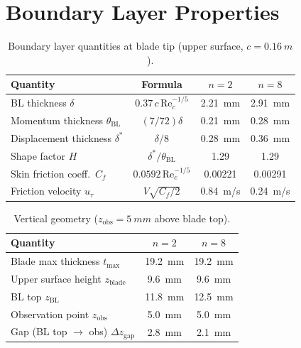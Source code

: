 \documentclass[11pt,a4paper]{article}
\begin{document}
\section{Boundary Layer Properties}
\label{sec:results_BL}

\begin{table}[H]
\centering
\caption{Boundary layer quantities at blade tip (upper surface, $c = \SI{0.16}{m}$).}
\label{tab:BL}
\begin{tabular}{lccc}
\toprule
Quantity & Formula & $n = 2$ & $n = 8$ \\
\midrule
BL thickness $\delta$ & $0.37\,c\,\mathrm{Re}_c^{-1/5}$
  & \SI{2.21}{mm} & \SI{2.91}{mm} \\
Momentum thickness $\theta_\mathrm{BL}$ & $(7/72)\delta$
  & \SI{0.21}{mm} & \SI{0.28}{mm} \\
Displacement thickness $\delta^*$ & $\delta/8$
  & \SI{0.28}{mm} & \SI{0.36}{mm} \\
Shape factor $H$ & $\delta^*/\theta_\mathrm{BL}$
  & 1.29 & 1.29 \\
Skin friction coeff.\ $C_f$ & $0.0592\,\mathrm{Re}_c^{-1/5}$
  & 0.00221 & 0.00291 \\
Friction velocity $u_\tau$ & $V\sqrt{C_f/2}$
  & \SI{0.84}{m/s} & \SI{0.24}{m/s} \\
\bottomrule
\end{tabular}
\end{table}

\begin{table}[H]
\centering
\caption{Vertical geometry ($z_\mathrm{obs} = \SI{5}{mm}$ above blade top).}
\label{tab:geometry}
\begin{tabular}{lcc}
\toprule
Quantity & $n = 2$ & $n = 8$ \\
\midrule
Blade max thickness $t_\mathrm{max}$ & \SI{19.2}{mm} & \SI{19.2}{mm} \\
Upper surface height $z_\mathrm{blade}$ & \SI{9.6}{mm} & \SI{9.6}{mm} \\
BL top $z_\mathrm{BL}$ & \SI{11.8}{mm} & \SI{12.5}{mm} \\
Observation point $z_\mathrm{obs}$ & \SI{5.0}{mm} & \SI{5.0}{mm} \\
Gap (BL top $\to$ obs) $\Delta z_\mathrm{gap}$ & \SI{2.8}{mm} & \SI{2.1}{mm} \\
\bottomrule
\end{tabular}
\end{table}
\end{document}
